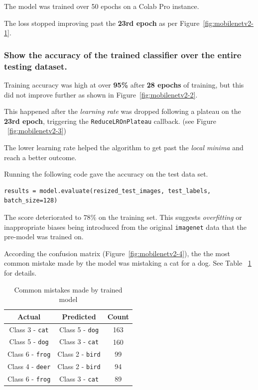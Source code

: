 \documentclass[12pt, letterpaper]{article}
\begin{document}
The model was trained over 50 epochs on a Colab Pro instance. 

The loss stopped improving past the \textbf{23rd epoch} as per Figure~\ref{fig:mobilenetv2-1}.

\subsubsection{Show the accuracy of the trained classifier over the entire testing dataset.}

Training accuracy was high at over \textbf{95\%} after \textbf{28 epochs} of training, but this did not improve further as shown in Figure~\ref{fig:mobilenetv2-2}.

This happened after the \textit{learning rate} was dropped following a plateau on the \textbf{23rd epoch}, triggering the \texttt{ReduceLROnPlateau} callback. (see Figure ~\ref{fig:mobilenetv2-3})

The lower learning rate helped the algorithm to get past the \textit{local minima} and reach a better outcome.

Running the following code gave the accuracy on the test data set.

\begin{verbatim}
results = model.evaluate(resized_test_images, test_labels, batch_size=128)
\end{verbatim}

The score deteriorated to $78\%$ on the training set. This suggests \textit{overfitting} or inappropriate biases being introduced from the original \texttt{imagenet} data that the pre-model was trained on.

According the confusion matrix (Figure~\ref{fig:mobilenetv2-4}), the the most common mistake made by the model was mistaking a cat for a dog. See Table ~\ref{table:ta1} for details.

\begin{table}
\begin{center}
\begin{tabular}{ccc}
\hline
\textbf{Actual} & \textbf{Predicted} & \textbf{Count}\\
\hline
Class 3 - \texttt{cat}&Class 5 - \texttt{dog}&163\\
Class 5 - \texttt{dog}&Class 3 - \texttt{cat}&160\\
Class 6 - \texttt{frog}&Class 2 - \texttt{bird}&99\\
Class 4 - \texttt{deer}&Class 2 - \texttt{bird}&94\\
Class 6 - \texttt{frog}&Class 3 - \texttt{cat}&89\\
\end{tabular}
\end{center}
\caption{Common mistakes made by trained model}
\label{table:ta1}
\end{table}
\end{document}
